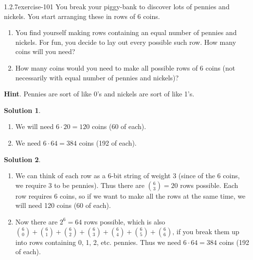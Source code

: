 \documentclass[twoside,11pt,]{book}
\numberwithin{equation}{chapter}
\begin{document}
\begin{divisionsolution}{1.2.7}{}{exercise-101}%
\hypertarget{p-1668}{}%
You break your piggy-bank to discover lots of pennies and nickels. You start arranging these in rows of 6 coins.\leavevmode%
\begin{enumerate}[label=(\alph*)]
\item\hypertarget{li-1168}{}\hypertarget{p-1669}{}%
You find yourself making rows containing an equal number of pennies and nickels. For fun, you decide to lay out every possible such row. How many coins will you need?%
\item\hypertarget{li-1169}{}\hypertarget{p-1671}{}%
How many coins would you need to make all possible rows of 6 coins (not necessarily with equal number of pennies and nickels)?%
\end{enumerate}
%
\par\smallskip%
\noindent\textbf{Hint}.\quad%
\hypertarget{p-1673}{}%
Pennies are sort of like 0's and nickels are sort of like 1's.%
\par\smallskip%
\noindent\textbf{Solution 1}.\quad%
\hypertarget{p-1674}{}%
\leavevmode%
\begin{enumerate}[label=(\alph*)]
\item\hypertarget{li-1170}{}\hypertarget{p-1675}{}%
We will need \(6\cdot 20 = 120\) coins (60 of each).%
\item\hypertarget{li-1171}{}\hypertarget{p-1676}{}%
We need \(6 \cdot 64 = 384\) coins (192 of each).%
\end{enumerate}
%
\par\smallskip%
\noindent\textbf{Solution 2}.\quad%
\hypertarget{p-1677}{}%
\leavevmode%
\begin{enumerate}[label=(\alph*)]
\item\hypertarget{li-1172}{}\hypertarget{p-1678}{}%
We can think of each row as a 6-bit string of weight 3 (since of the 6 coins, we require 3 to be pennies). Thus there are \({6 \choose 3} = 20\) rows possible. Each row requires 6 coins, so if we want to make all the rows at the same time, we will need 120 coins (60 of each).%
\item\hypertarget{li-1173}{}\hypertarget{p-1679}{}%
Now there are \(2^6 = 64\) rows possible, which is also \({6 \choose 0} + {6\choose 1} + {6 \choose 2} + {6 \choose 3} + {6 \choose 4} + {6 \choose 5} + {6 \choose 6}\text{,}\) if you break them up into rows containing 0, 1, 2, etc. pennies. Thus we need \(6 \cdot 64 = 384\) coins (192 of each).%
\end{enumerate}
%
\end{divisionsolution}%
\end{document}
